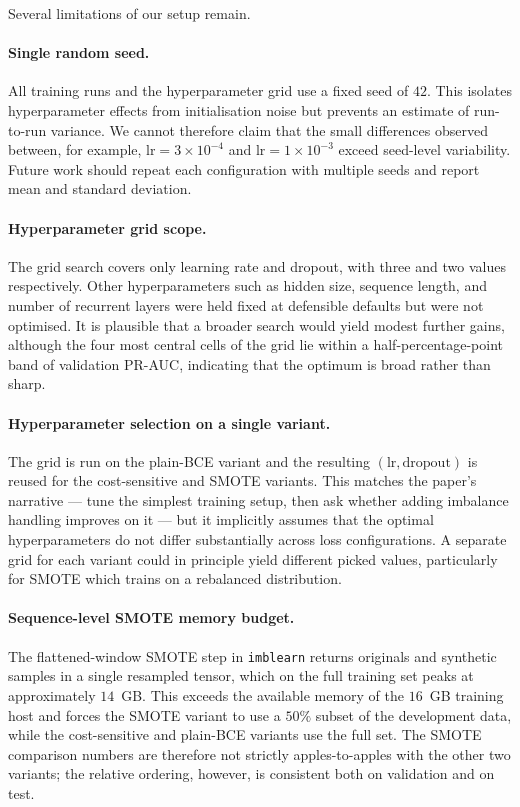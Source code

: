 \documentclass[oneside,12pt,parskip=half,american,numbers=noenddot]{scrreprt}
\begin{document}
Several limitations of our setup remain.

\paragraph{Single random seed.}
All training runs and the hyperparameter grid use a fixed seed of $42$. This isolates hyperparameter effects from initialisation noise but prevents an estimate of run-to-run variance. We cannot therefore claim that the small differences observed between, for example, $\text{lr} = 3\times 10^{-4}$ and $\text{lr} = 1\times 10^{-3}$ exceed seed-level variability. Future work should repeat each configuration with multiple seeds and report mean and standard deviation.

\paragraph{Hyperparameter grid scope.}
The grid search covers only learning rate and dropout, with three and two values respectively. Other hyperparameters such as hidden size, sequence length, and number of recurrent layers were held fixed at defensible defaults but were not optimised. It is plausible that a broader search would yield modest further gains, although the four most central cells of the grid lie within a half-percentage-point band of validation PR-AUC, indicating that the optimum is broad rather than sharp.

\paragraph{Hyperparameter selection on a single variant.}
The grid is run on the plain-BCE variant and the resulting $(\text{lr}, \text{dropout})$ is reused for the cost-sensitive and SMOTE variants. This matches the paper's narrative — tune the simplest training setup, then ask whether adding imbalance handling improves on it — but it implicitly assumes that the optimal hyperparameters do not differ substantially across loss configurations. A separate grid for each variant could in principle yield different picked values, particularly for SMOTE which trains on a rebalanced distribution.

\paragraph{Sequence-level SMOTE memory budget.}
The flattened-window SMOTE step in \texttt{imblearn} returns originals and synthetic samples in a single resampled tensor, which on the full training set peaks at approximately $14$~GB. This exceeds the available memory of the $16$~GB training host and forces the SMOTE variant to use a $50\%$ subset of the development data, while the cost-sensitive and plain-BCE variants use the full set. The SMOTE comparison numbers are therefore not strictly apples-to-apples with the other two variants; the relative ordering, however, is consistent both on validation and on test.
\end{document}

